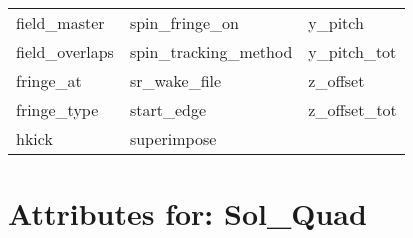 \begin{tabular}{lll}
field_master                & spin_fringe_on              & y_pitch                     \\
field_overlaps              & spin_tracking_method        & y_pitch_tot                 \\
fringe_at                   & sr_wake_file                & z_offset                    \\
fringe_type                 & start_edge                  & z_offset_tot                \\
hkick                       & superimpose                 &                             \\
 \bottomrule
 \end{tabular}
 \vfill
 
 \section{Attributes for: Sol_Quad}
 \label{s:list.sol.quad}
 
